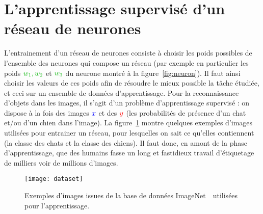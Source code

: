 \section{L'apprentissage supervisé d'un réseau de neurones}

L'entrainement d'un réseau de neurones consiste à choisir les  poids possibles de l'ensemble des neurones qui compose un réseau (par exemple en particulier les poids $\mygreen{w_1, w_2}$ et $\mygreen{w_3}$ du neurone montré à la figure~\ref{fig:neuron}). 
%
Il faut ainsi choisir les valeurs de ces poids afin de résoudre le mieux possible la tâche étudiée, et ceci sur un ensemble de données d'apprentissage. 
%
Pour la reconnaissance d'objets dans les images, il s'agit d'un problème d'apprentissage supervisé : on dispose à la fois des images ${\color{blue} x}$ et des ${\color{red} y}$ (les probabilités de présence d'un chat et/ou d'un chien dans l'image).
%
La figure~\ref{fig:dataset} montre quelques exemples d'images utilisées pour entrainer un réseau, pour lesquelles on sait ce qu'elles contiennent (la classe des chats et la classe des chiens). 
%
Il faut donc, en amont de la phase d'apprentissage, que des humains fasse un long et fastidieux travail d'étiquetage de milliers voir de millions d'images. 


\begin{figure}\centering
	\texttt{[image: dataset]}
\caption{\label{fig:dataset} Exemples d'images issues de la base de données ImageNet~\cite{deng2009imagenet} utilisées pour l'apprentissage. }
\end{figure}

